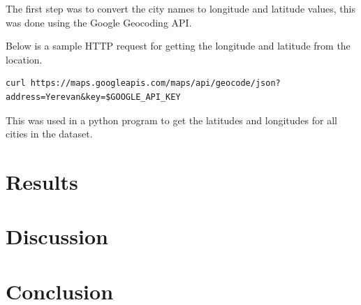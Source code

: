 \documentclass[]{article}
\begin{document}
The first step was to convert the city names to longitude and latitude values,
this was done using the Google Geocoding API.

Below is a sample HTTP request for getting the longitude and latitude from the location.

\begin{verbatim}
curl https://maps.googleapis.com/maps/api/geocode/json?address=Yerevan&key=$GOOGLE_API_KEY
\end{verbatim}

This was used in a python program to get the latitudes and longitudes for all cities in the dataset.

\section{Results}

\section{Discussion}

\section{Conclusion}
\end{document}
